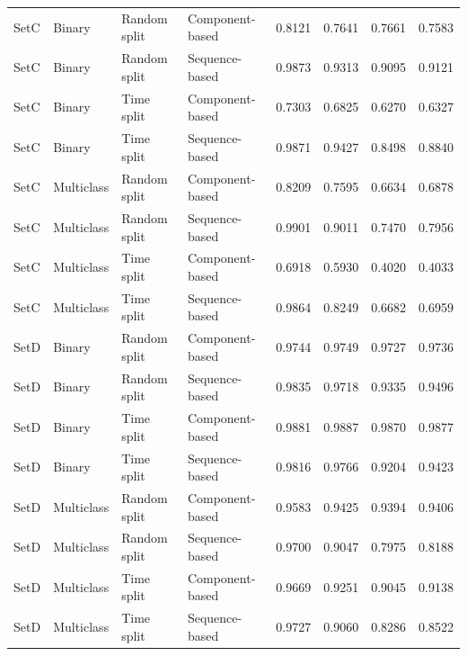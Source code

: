 \begin{table}
\begin{tabular}{llllrrrr}
SetC & Binary & Random split & Component-based & 0.8121 & 0.7641 & 0.7661 & 0.7583 \\
SetC & Binary & Random split & Sequence-based & 0.9873 & 0.9313 & 0.9095 & 0.9121 \\
SetC & Binary & Time split & Component-based & 0.7303 & 0.6825 & 0.6270 & 0.6327 \\
SetC & Binary & Time split & Sequence-based & 0.9871 & 0.9427 & 0.8498 & 0.8840 \\
SetC & Multiclass & Random split & Component-based & 0.8209 & 0.7595 & 0.6634 & 0.6878 \\
SetC & Multiclass & Random split & Sequence-based & 0.9901 & 0.9011 & 0.7470 & 0.7956 \\
SetC & Multiclass & Time split & Component-based & 0.6918 & 0.5930 & 0.4020 & 0.4033 \\
SetC & Multiclass & Time split & Sequence-based & 0.9864 & 0.8249 & 0.6682 & 0.6959 \\
SetD & Binary & Random split & Component-based & 0.9744 & 0.9749 & 0.9727 & 0.9736 \\
SetD & Binary & Random split & Sequence-based & 0.9835 & 0.9718 & 0.9335 & 0.9496 \\
SetD & Binary & Time split & Component-based & 0.9881 & 0.9887 & 0.9870 & 0.9877 \\
SetD & Binary & Time split & Sequence-based & 0.9816 & 0.9766 & 0.9204 & 0.9423 \\
SetD & Multiclass & Random split & Component-based & 0.9583 & 0.9425 & 0.9394 & 0.9406 \\
SetD & Multiclass & Random split & Sequence-based & 0.9700 & 0.9047 & 0.7975 & 0.8188 \\
SetD & Multiclass & Time split & Component-based & 0.9669 & 0.9251 & 0.9045 & 0.9138 \\
SetD & Multiclass & Time split & Sequence-based & 0.9727 & 0.9060 & 0.8286 & 0.8522 \\
\bottomrule
\end{tabular}
\end{table}

